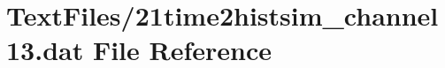 \hypertarget{21time2histsim__channel13_8dat}{}\section{Text\+Files/21time2histsim\+\_\+channel13.dat File Reference}
\label{21time2histsim__channel13_8dat}
